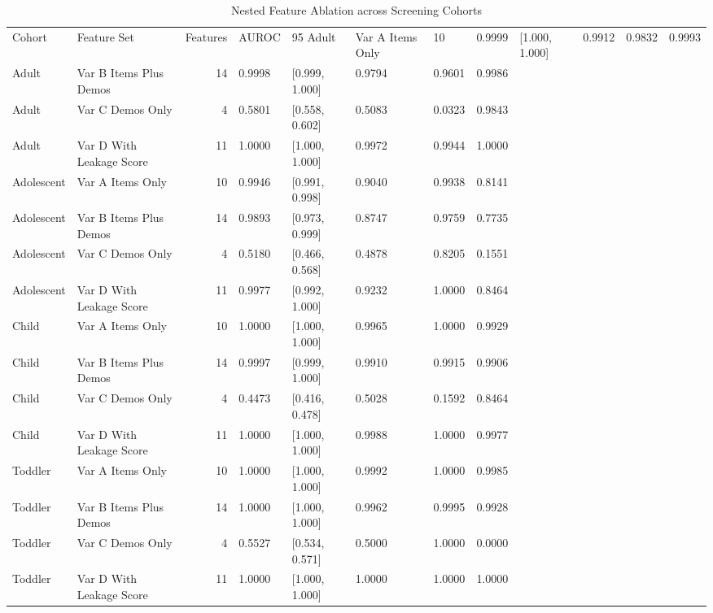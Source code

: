 \begin{table}
\caption{Nested Feature Ablation across Screening Cohorts}
\label{tab:feature_ablation}
\begin{tabular}{llrlllll}
\toprule
Cohort & Feature Set & Features & AUROC & 95%
\midrule
Adult & Var A Items Only & 10 & 0.9999 & [1.000, 1.000] & 0.9912 & 0.9832 & 0.9993 \\
Adult & Var B Items Plus Demos & 14 & 0.9998 & [0.999, 1.000] & 0.9794 & 0.9601 & 0.9986 \\
Adult & Var C Demos Only & 4 & 0.5801 & [0.558, 0.602] & 0.5083 & 0.0323 & 0.9843 \\
Adult & Var D With Leakage Score & 11 & 1.0000 & [1.000, 1.000] & 0.9972 & 0.9944 & 1.0000 \\
Adolescent & Var A Items Only & 10 & 0.9946 & [0.991, 0.998] & 0.9040 & 0.9938 & 0.8141 \\
Adolescent & Var B Items Plus Demos & 14 & 0.9893 & [0.973, 0.999] & 0.8747 & 0.9759 & 0.7735 \\
Adolescent & Var C Demos Only & 4 & 0.5180 & [0.466, 0.568] & 0.4878 & 0.8205 & 0.1551 \\
Adolescent & Var D With Leakage Score & 11 & 0.9977 & [0.992, 1.000] & 0.9232 & 1.0000 & 0.8464 \\
Child & Var A Items Only & 10 & 1.0000 & [1.000, 1.000] & 0.9965 & 1.0000 & 0.9929 \\
Child & Var B Items Plus Demos & 14 & 0.9997 & [0.999, 1.000] & 0.9910 & 0.9915 & 0.9906 \\
Child & Var C Demos Only & 4 & 0.4473 & [0.416, 0.478] & 0.5028 & 0.1592 & 0.8464 \\
Child & Var D With Leakage Score & 11 & 1.0000 & [1.000, 1.000] & 0.9988 & 1.0000 & 0.9977 \\
Toddler & Var A Items Only & 10 & 1.0000 & [1.000, 1.000] & 0.9992 & 1.0000 & 0.9985 \\
Toddler & Var B Items Plus Demos & 14 & 1.0000 & [1.000, 1.000] & 0.9962 & 0.9995 & 0.9928 \\
Toddler & Var C Demos Only & 4 & 0.5527 & [0.534, 0.571] & 0.5000 & 1.0000 & 0.0000 \\
Toddler & Var D With Leakage Score & 11 & 1.0000 & [1.000, 1.000] & 1.0000 & 1.0000 & 1.0000 \\
\bottomrule
\end{tabular}
\end{table}
